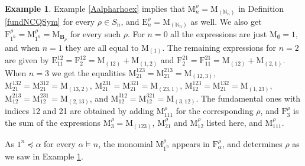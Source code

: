 \documentclass{article}
\theoremstyle{definition}
\newtheorem{ex}[thm]{Example}
\begin{document}
\begin{ex}
Example \ref{Aalpharhoex} implies that $\mathrm{M}_{n}^{\rho}=\mathrm{M}_{(\mathbb{N}_{n})}$ in Definition \ref{fundNCQSym} for every $\rho \in S_{n}$, and $\mathrm{E}_{n}^{\rho}=\mathrm{M}_{(\mathbb{N}_{n})}$ as well. We also get $\mathrm{F}_{1^{n}}^{\rho}=\mathrm{M}_{1^{n}}^{\rho}=\mathrm{M}_{\mathbf{B}_{\rho}}$ for every such $\rho$. For $n=0$ all the expressions are just $\mathrm{M}_{\emptyset}=1$, and when $n=1$ they are all equal to $\mathrm{M}_{(1)}$. The remaining expressions for $n=2$ are given by $\mathrm{E}_{11}^{12}=\mathrm{F}_{2}^{12}=\mathrm{M}_{(12)}+\mathrm{M}_{(1,2)}$ and $\mathrm{F}_{2}^{21}=\mathrm{F}_{11}^{21}=\mathrm{M}_{(12)}+\mathrm{M}_{(2,1)}$. When $n=3$ we get the equalities $\mathrm{M}_{21}^{123}=\mathrm{M}_{21}^{213}=\mathrm{M}_{(12,3)}$, $\mathrm{M}_{21}^{132}=\mathrm{M}_{21}^{312}=\mathrm{M}_{(13,2)}$, $\mathrm{M}_{21}^{231}=\mathrm{M}_{21}^{321}=\mathrm{M}_{(23,1)}$, $\mathrm{M}_{12}^{123}=\mathrm{M}_{21}^{132}=\mathrm{M}_{(1,23)}$, $\mathrm{M}_{12}^{213}=\mathrm{M}_{12}^{231}=\mathrm{M}_{(2,13)}$, and $\mathrm{M}_{12}^{312}=\mathrm{M}_{12}^{321}=\mathrm{M}_{(3,12)}$. The fundamental ones with indices 12 and 21 are obtained by adding $\mathrm{M}_{111}^{\rho}$ for the corresponding $\rho$, and $\mathrm{F}_{3}^{\rho}$ is the sum of the expressions $\mathrm{M}_{3}^{\rho}=\mathrm{M}_{(123)}$, $\mathrm{M}_{21}^{\rho}$ and $\mathrm{M}_{12}^{\rho}$ listed here, and $\mathrm{M}_{111}^{\rho}$. \label{exfundNCQ}
\end{ex}
As $1^{n}\preceq\alpha$ for every $\alpha \vDash n$, the monomial $\mathrm{M}_{1^{n}}^{\rho}$ appears in $\mathrm{F}_{\alpha}^{\rho}$, and determines $\rho$ as we saw in Example \ref{exfundNCQ}.

\medskip
\end{document}
